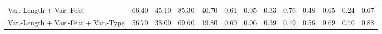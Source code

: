 \begin{tabular}{lrrrrrrrrrrrr}
Var.-Length + Var.-Feat              &                                       66.40 &                                           45.10 &                                      85.30 &                                           40.70 &                        0.61 &                            0.05 &                       0.33 &                            0.76 &                              0.48 &                                  0.65 &                             0.24 &                                  0.67 \\
Var.-Length + Var.-Feat + Var.-Type  &                                       56.70 &                                           38.00 &                                      69.60 &                                           19.80 &                        0.60 &                            0.06 &                       0.39 &                            0.49 &                              0.56 &                                  0.69 &                             0.40 &                                  0.88 \\
\bottomrule
\end{tabular}
